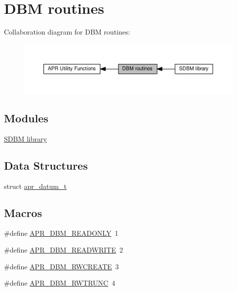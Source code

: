 \hypertarget{group__APR__Util__DBM}{}\section{D\+BM routines}
\label{group__APR__Util__DBM}
Collaboration diagram for D\+BM routines\+:
\nopagebreak
\begin{figure}[H]
\begin{center}
\leavevmode
\includegraphics[width=350pt]{group__APR__Util__DBM}
\end{center}
\end{figure}
\subsection*{Modules}
\begin{DoxyCompactItemize}
\item 
\hyperlink{group__APR__Util__DBM__SDBM}{S\+D\+B\+M library}
\end{DoxyCompactItemize}
\subsection*{Data Structures}
\begin{DoxyCompactItemize}
\item 
struct \hyperlink{structapr__datum__t}{apr\+\_\+datum\+\_\+t}
\end{DoxyCompactItemize}
\subsection*{Macros}
\begin{DoxyCompactItemize}
\item 
\#define \hyperlink{group__APR__Util__DBM_gacd6e9c0783bd0c232bdd02b14655b6b1}{A\+P\+R\+\_\+\+D\+B\+M\+\_\+\+R\+E\+A\+D\+O\+N\+LY}~1
\item 
\#define \hyperlink{group__APR__Util__DBM_gaf693166e76d6f84b12a0d75307687053}{A\+P\+R\+\_\+\+D\+B\+M\+\_\+\+R\+E\+A\+D\+W\+R\+I\+TE}~2
\item 
\#define \hyperlink{group__APR__Util__DBM_gabf461a27dab1f4cc7405e891d2ad6522}{A\+P\+R\+\_\+\+D\+B\+M\+\_\+\+R\+W\+C\+R\+E\+A\+TE}~3
\item 
\#define \hyperlink{group__APR__Util__DBM_ga8bffe207158704162c24fa74dc1b9264}{A\+P\+R\+\_\+\+D\+B\+M\+\_\+\+R\+W\+T\+R\+U\+NC}~4
\end{DoxyCompactItemize}
